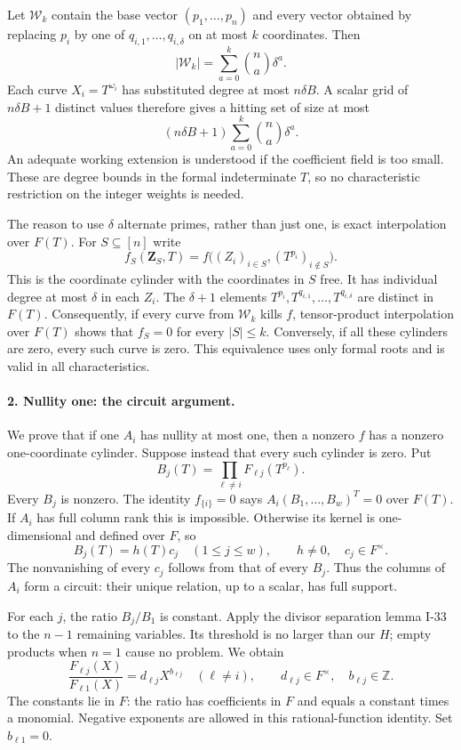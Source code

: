 Let $\mathcal W_k$ contain the base vector $(p_1,\ldots,p_n)$
and every vector obtained by replacing $p_i$ by one of
$q_{i,1},\ldots,q_{i,\delta}$ on at most $k$ coordinates.
Then
\[
 |\mathcal W_k|=
 \sum_{a=0}^{k}\binom na\delta^a.
 \tag{I.68}
\]
Each curve $X_i=T^{\omega_i}$ has substituted degree at most
$n\delta B$. A scalar grid of $n\delta B+1$ distinct values
therefore gives a hitting set of size at most
\[
 (n\delta B+1)\sum_{a=0}^{k}\binom na\delta^a.
 \tag{I.69}
\]
An adequate working extension is understood if the coefficient
field is too small. These are degree bounds in the formal
indeterminate $T$, so no characteristic restriction on the
integer weights is needed.

The reason to use $\delta$ alternate primes, rather than just
one, is exact interpolation over $F(T)$. For $S\subseteq[n]$
write
\[
 f_S(\mathbf Z_S,T)=
 f\bigl((Z_i)_{i\in S},(T^{p_i})_{i\notin S}\bigr).
 \tag{I.70}
\]
This is the coordinate cylinder with the coordinates in $S$
free. It has individual degree at most $\delta$ in each $Z_i$.
The $\delta+1$ elements
$T^{p_i},T^{q_{i,1}},\ldots,T^{q_{i,\delta}}$ are distinct
in $F(T)$. Consequently, if every curve from $\mathcal W_k$
kills $f$, tensor-product interpolation over $F(T)$ shows that
$f_S=0$ for every $|S|\le k$. Conversely, if all these cylinders
are zero, every such curve is zero. This equivalence uses only
formal roots and is valid in all characteristics.

\paragraph{2. Nullity one: the circuit argument.}
We prove that if one $A_i$ has nullity at most one, then a
nonzero $f$ has a nonzero one-coordinate cylinder. Suppose
instead that every such cylinder is zero. Put
\[
 B_j(T)=\prod_{\ell\ne i}F_{\ell j}(T^{p_\ell}).
\]
Every $B_j$ is nonzero. The identity $f_{\{i\}}=0$ says
$A_i(B_1,\ldots,B_w)^T=0$ over $F(T)$.
If $A_i$ has full column rank this is impossible. Otherwise
its kernel is one-dimensional and defined over $F$, so
\[
 B_j(T)=h(T)c_j\quad(1\le j\le w),
 \qquad h\ne0,\quad c_j\in F^\times.
 \tag{I.71}
\]
The nonvanishing of every $c_j$ follows from that of every
$B_j$. Thus the columns of $A_i$ form a circuit: their unique
relation, up to a scalar, has full support.

For each $j$, the ratio $B_j/B_1$ is constant. Apply the
divisor separation lemma I-33 to the $n-1$ remaining variables.
Its threshold is no larger than our $H$; empty products when
$n=1$ cause no problem. We obtain
\[
 \frac{F_{\ell j}(X)}{F_{\ell1}(X)}
       =d_{\ell j}X^{b_{\ell j}}
 \quad(\ell\ne i),
 \qquad d_{\ell j}\in F^\times,
 \quad b_{\ell j}\in\mathbb Z.
 \tag{I.72}
\]
The constants lie in $F$: the ratio has coefficients in $F$
and equals a constant times a monomial. Negative exponents
are allowed in this rational-function identity. Set
$b_{\ell1}=0$.


